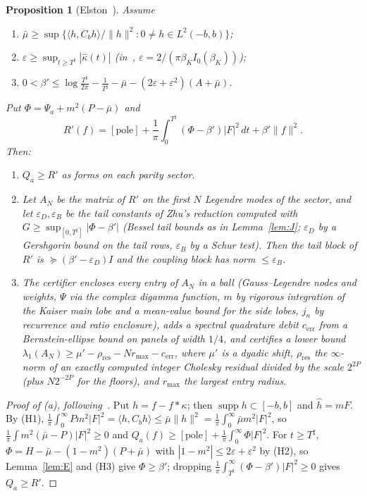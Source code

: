 \documentclass[11pt]{amsart}
\newcommand{\pole}{\mathrm{pole}}
\newcommand{\Tsh}{T^{\sharp}}
\newcommand{\eps}{\varepsilon}
\newtheorem{proposition}[theorem]{Proposition}
\theoremstyle{definition}
\theoremstyle{remark}
\numberwithin{equation}{section}
\begin{document}
\begin{proposition}[Elston~\cite{Elston}]\label{prop:elston}
Assume
\begin{enumerate}
\item[(H1)] $\bar\mu\ge\sup\{\langle h,C_bh\rangle/\|h\|^2:0\ne h\in L^2(-b,b)\}$;
\item[(H2)] $\eps\ge\sup_{t\ge\Tsh}|\hat\kappa(t)|$ (in~\cite{Elston}, $\eps=2/(\pi\beta_KI_0(\beta_K))$);
\item[(H3)] $0<\beta'\le\log\frac{\Tsh}{2\pi}-\frac1{\Tsh}-\bar\mu-(2\eps+\eps^2)(A+\bar\mu)$.
\end{enumerate}
Put $\Phi=\Psi_a+m^2(P-\bar\mu)$ and
\[
R'(f)=[\pole]+\frac1\pi\int_0^{\Tsh}(\Phi-\beta')|F|^2\,dt+\beta'\|f\|^2.
\]
Then:
\begin{enumerate}
\item[(a)] $Q_a\ge R'$ as forms on each parity sector.
\item[(b)] Let $A_N$ be the matrix of $R'$ on the first $N$ Legendre modes of the sector, and let $\eps_D,\eps_B$ be the tail constants of Zhu's reduction computed with $G\ge\sup_{[0,\Tsh]}|\Phi-\beta'|$ (Bessel tail bounds as in Lemma~\ref{lem:J}; $\eps_D$ by a Gershgorin bound on the tail rows, $\eps_B$ by a Schur test). Then the tail block of $R'$ is $\succeq(\beta'-\eps_D)I$ and the coupling block has norm $\le\eps_B$.
\item[(c)] The certifier encloses every entry of $A_N$ in a ball (Gauss--Legendre nodes and weights, $\Psi$ via the complex digamma function, $m$ by rigorous integration of the Kaiser main lobe and a mean-value bound for the side lobes, $j_n$ by recurrence and ratio enclosure), adds a spectral quadrature debit $c_{\mathrm{err}}$ from a Bernstein-ellipse bound on panels of width $1/4$, and certifies a lower bound $\lambda_1(A_N)\ge\mu'-\rho_{\mathrm{res}}-N r_{\max}-c_{\mathrm{err}}$, where $\mu'$ is a dyadic shift, $\rho_{\mathrm{res}}$ the $\infty$-norm of an exactly computed integer Cholesky residual divided by the scale $2^{2P}$ (plus $N2^{-2P}$ for the floors), and $r_{\max}$ the largest entry radius.
\end{enumerate}
\end{proposition}
\begin{proof}[Proof of (a), following~\cite{Elston}]
Put $h=f-f*\kappa$; then $\operatorname{supp}h\subset[-b,b]$ and $\hat h=mF$. By (H1), $\frac1\pi\int_0^\infty Pm^2|F|^2=\langle h,C_bh\rangle\le\bar\mu\|h\|^2=\frac1\pi\int_0^\infty\bar\mu m^2|F|^2$, so $\frac1\pi\int m^2(\bar\mu-P)|F|^2\ge0$ and $Q_a(f)\ge[\pole]+\frac1\pi\int_0^\infty\Phi|F|^2$. For $t\ge\Tsh$, $\Phi=H-\bar\mu-(1-m^2)(P+\bar\mu)$ with $|1-m^2|\le2\eps+\eps^2$ by (H2), so Lemma~\ref{lem:E} and (H3) give $\Phi\ge\beta'$; dropping $\frac1\pi\int_{\Tsh}^\infty(\Phi-\beta')|F|^2\ge0$ gives $Q_a\ge R'$.
\end{proof}
\end{document}
